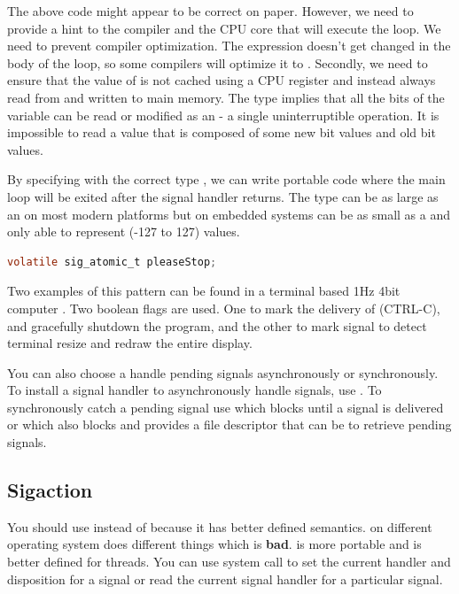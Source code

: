 The above code might appear to be correct on paper.
However, we need to provide a hint to the compiler and the CPU core that will execute the  loop.
We need to prevent compiler optimization.
The expression  doesn't get changed in the body of the loop, so some compilers will optimize it to  .
Secondly, we need to ensure that the value of  is not cached using a CPU register and instead always read from and written to main memory.
The  type implies that all the bits of the variable can be read or modified as an  - a single uninterruptible operation.
It is impossible to read a value that is composed of some new bit values and old bit values.

By specifying  with the correct type , we can write portable code where the main loop will be exited after the signal handler returns.
The  type can be as large as an  on most modern platforms but on embedded systems can be as small as a  and only able to represent (-127 to 127) values.

\begin{lstlisting}[language=C]
volatile sig_atomic_t pleaseStop;
\end{lstlisting}

Two examples of this pattern can be found in  a terminal based 1Hz 4bit computer \cite{Sorn_2015}.
Two boolean flags are used.
One to mark the delivery of  (CTRL-C), and gracefully shutdown the program, and the other to mark  signal to detect terminal resize and redraw the entire display.

You can also choose a handle pending signals asynchronously or synchronously.
To install a signal handler to asynchronously handle signals, use .
To synchronously catch a pending signal use  which blocks until a signal is delivered or  which also blocks and provides a file descriptor that can be  to retrieve pending signals.

\subsection{Sigaction}

You should use  instead of  because it has better defined semantics.
 on different operating system does different things which is \textbf{bad}.
 is more portable and is better defined for threads.
You can use system call  to set the current handler and disposition for a signal or read the current signal handler for a particular signal.

